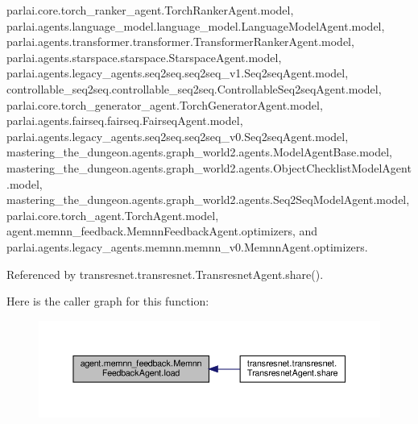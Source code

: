 parlai.\+core.\+torch\+\_\+ranker\+\_\+agent.\+Torch\+Ranker\+Agent.\+model, parlai.\+agents.\+language\+\_\+model.\+language\+\_\+model.\+Language\+Model\+Agent.\+model, parlai.\+agents.\+transformer.\+transformer.\+Transformer\+Ranker\+Agent.\+model, parlai.\+agents.\+starspace.\+starspace.\+Starspace\+Agent.\+model, parlai.\+agents.\+legacy\+\_\+agents.\+seq2seq.\+seq2seq\+\_\+v1.\+Seq2seq\+Agent.\+model, controllable\+\_\+seq2seq.\+controllable\+\_\+seq2seq.\+Controllable\+Seq2seq\+Agent.\+model, parlai.\+core.\+torch\+\_\+generator\+\_\+agent.\+Torch\+Generator\+Agent.\+model, parlai.\+agents.\+fairseq.\+fairseq.\+Fairseq\+Agent.\+model, parlai.\+agents.\+legacy\+\_\+agents.\+seq2seq.\+seq2seq\+\_\+v0.\+Seq2seq\+Agent.\+model, mastering\+\_\+the\+\_\+dungeon.\+agents.\+graph\+\_\+world2.\+agents.\+Model\+Agent\+Base.\+model, mastering\+\_\+the\+\_\+dungeon.\+agents.\+graph\+\_\+world2.\+agents.\+Object\+Checklist\+Model\+Agent.\+model, mastering\+\_\+the\+\_\+dungeon.\+agents.\+graph\+\_\+world2.\+agents.\+Seq2\+Seq\+Model\+Agent.\+model, parlai.\+core.\+torch\+\_\+agent.\+Torch\+Agent.\+model, agent.\+memnn\+\_\+feedback.\+Memnn\+Feedback\+Agent.\+optimizers, and parlai.\+agents.\+legacy\+\_\+agents.\+memnn.\+memnn\+\_\+v0.\+Memnn\+Agent.\+optimizers.



Referenced by transresnet.\+transresnet.\+Transresnet\+Agent.\+share().

Here is the caller graph for this function\+:
\nopagebreak
\begin{figure}[H]
\begin{center}
\leavevmode
\includegraphics[width=350pt]{classagent_1_1memnn__feedback_1_1MemnnFeedbackAgent_a1d616b4215665efb7df23f0477850827_icgraph}
\end{center}
\end{figure}
\mbox{\label{classagent_1_1memnn__feedback_1_1MemnnFeedbackAgent_a79f079fe15142c93348c8a9892b25b27}} 
